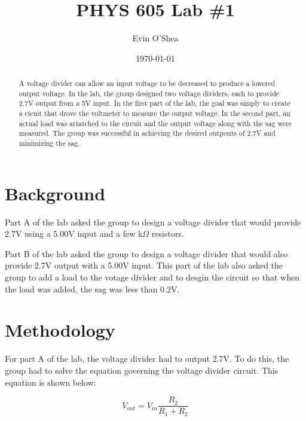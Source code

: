 \documentclass[twocolumn, amsmath]{revtex4}
\begin{document}
\title{PHYS 605 Lab \#1} 

\author{Evin O'Shea}  %
\date{\today}  


\begin{abstract}
A voltage divider can allow an input voltage to be decreased to produce a lowered output voltage. In the lab, the group designed two voltage dividers, each to provide 2.7V output from a 5V input. In the first part of the lab, the goal was simply to create a cicuit that drove the voltmeter to measure the output voltage. In the second part, an actual load was attatched to the circuit and the output voltage along with the sag were measured. The group was successful in achieving the desired outpouts of 2.7V and minimizing the sag.
	

\end{abstract}

\maketitle

%
%
\section{Background}

Part A of the lab asked the group to design a voltage divider that would provide 2.7V using a 5.00V input and a few k$\Omega$ resistors.

Part B of the lab asked the group to design a voltage divider that would also provide 2.7V output with a 5.00V input. This part of the lab also asked the group to add a load to the votage divider and to desgin the circuit so that when the load was added, the sag was less than 0.2V.
	


\section{Methodology}

For part A of the lab, the voltage divider had to output 2.7V. To do this, the group had to solve the equation governing the voltage divider circuit. This equation is shown below:

\begin{equation}
V_{out} = V_{in}\frac{R_2}{R_1 + R_2}
\end{equation}
\end{document}
